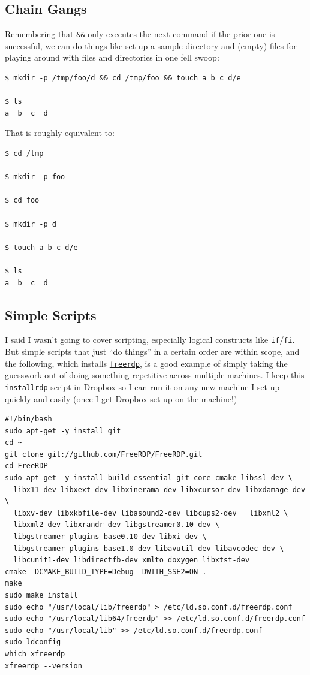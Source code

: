 \documentclass[10pt,]{book}
\numberwithin{figure}{chapter}
\begin{document}
\subsection{Chain Gangs}\label{chain-gangs}

Remembering that \texttt{\&\&} only executes the next command if the
prior one is successful, we can do things like set up a sample directory
and (empty) files for playing around with files and directories in one
fell swoop:

\begin{verbatim}
$ mkdir -p /tmp/foo/d && cd /tmp/foo && touch a b c d/e

$ ls
a  b  c  d
\end{verbatim}

That is roughly equivalent to:

\begin{verbatim}
$ cd /tmp

$ mkdir -p foo

$ cd foo

$ mkdir -p d

$ touch a b c d/e

$ ls
a  b  c  d
\end{verbatim}

\subsection{Simple Scripts}\label{simple-scripts}

I said I wasn't going to cover scripting, especially logical constructs
like \texttt{if}/\texttt{fi}. But simple scripts that just ``do things''
in a certain order are within scope, and the following, which installs
\href{https://github.com/freerdp/freerdp}{\texttt{freerdp}}, is a good
example of simply taking the guesswork out of doing something repetitive
across multiple machines. I keep this \texttt{installrdp} script in
Dropbox so I can run it on any new machine I set up quickly and easily
(once I get Dropbox set up on the machine!)

\begin{verbatim}
#!/bin/bash
sudo apt-get -y install git
cd ~
git clone git://github.com/FreeRDP/FreeRDP.git
cd FreeRDP
sudo apt-get -y install build-essential git-core cmake libssl-dev \
  libx11-dev libxext-dev libxinerama-dev libxcursor-dev libxdamage-dev \
  libxv-dev libxkbfile-dev libasound2-dev libcups2-dev   libxml2 \
  libxml2-dev libxrandr-dev libgstreamer0.10-dev \
  libgstreamer-plugins-base0.10-dev libxi-dev \
  libgstreamer-plugins-base1.0-dev libavutil-dev libavcodec-dev \
  libcunit1-dev libdirectfb-dev xmlto doxygen libxtst-dev
cmake -DCMAKE_BUILD_TYPE=Debug -DWITH_SSE2=ON .
make
sudo make install
sudo echo "/usr/local/lib/freerdp" > /etc/ld.so.conf.d/freerdp.conf
sudo echo "/usr/local/lib64/freerdp" >> /etc/ld.so.conf.d/freerdp.conf
sudo echo "/usr/local/lib" >> /etc/ld.so.conf.d/freerdp.conf
sudo ldconfig
which xfreerdp
xfreerdp --version
\end{verbatim}
\end{document}
